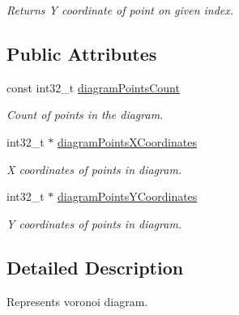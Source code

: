 \begin{DoxyCompactItemize}
\begin{DoxyCompactList}\small\item\em Returns Y coordinate of point on given index. \end{DoxyCompactList}\end{DoxyCompactItemize}
\subsection*{Public Attributes}
\begin{DoxyCompactItemize}
\item 
const int32\+\_\+t \hyperlink{structlossycompressor_1_1_voronoi_diagram_a3b79c4a4ce91a937149b644304645e6d}{diagram\+Points\+Count}\hypertarget{structlossycompressor_1_1_voronoi_diagram_a3b79c4a4ce91a937149b644304645e6d}{}\label{structlossycompressor_1_1_voronoi_diagram_a3b79c4a4ce91a937149b644304645e6d}

\begin{DoxyCompactList}\small\item\em Count of points in the diagram. \end{DoxyCompactList}\item 
int32\+\_\+t $\ast$ \hyperlink{structlossycompressor_1_1_voronoi_diagram_a2bf9675b587d2114d0e9d5184d1ad48f}{diagram\+Points\+X\+Coordinates}\hypertarget{structlossycompressor_1_1_voronoi_diagram_a2bf9675b587d2114d0e9d5184d1ad48f}{}\label{structlossycompressor_1_1_voronoi_diagram_a2bf9675b587d2114d0e9d5184d1ad48f}

\begin{DoxyCompactList}\small\item\em X coordinates of points in diagram. \end{DoxyCompactList}\item 
int32\+\_\+t $\ast$ \hyperlink{structlossycompressor_1_1_voronoi_diagram_ac3efa950729f936c3281b82599d5f3fc}{diagram\+Points\+Y\+Coordinates}\hypertarget{structlossycompressor_1_1_voronoi_diagram_ac3efa950729f936c3281b82599d5f3fc}{}\label{structlossycompressor_1_1_voronoi_diagram_ac3efa950729f936c3281b82599d5f3fc}

\begin{DoxyCompactList}\small\item\em Y coordinates of points in diagram. \end{DoxyCompactList}\end{DoxyCompactItemize}


\subsection{Detailed Description}
Represents voronoi diagram. 

